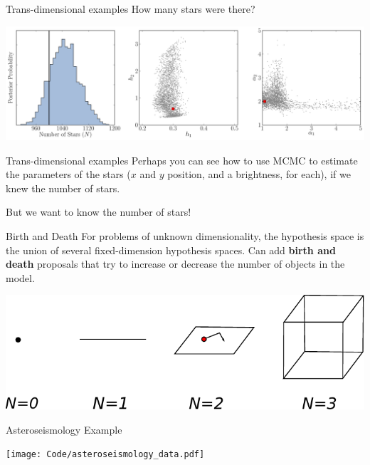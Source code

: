 \begin{frame}[t]{Trans-dimensional examples}
How many stars were there?
\begin{center}
\includegraphics[scale=0.25]{inference2.pdf}
\end{center}

\end{frame}

\begin{frame}[t]{Trans-dimensional examples}
Perhaps you can see how to use MCMC to estimate the parameters of the
stars ($x$ and $y$ position, and a brightness, for each), if we knew the
number of stars.

\vspace{20pt}
But we want to know the number of stars!
\end{frame}



\begin{frame}[t]{Birth and Death}
For problems of unknown dimensionality, the hypothesis space is the union
of several fixed-dimension hypothesis spaces. Can add {\bf birth and death}
proposals that try to increase or decrease the number of objects in the model.

\begin{center}
\includegraphics[scale=0.7]{drawing.pdf}
\end{center}

\end{frame}

\begin{frame}[t]{Asteroseismology Example}


\begin{center}
\texttt{[image: Code/asteroseismology\_data.pdf]}
\end{center}

\end{frame}



